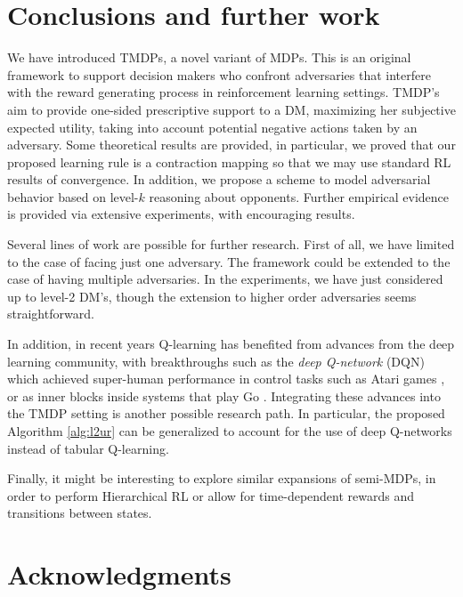 \documentclass[letterpaper]{article} %
\begin{document}
\section{Conclusions and further work}


We have introduced TMDPs, a novel variant of MDPs. This is an original framework to support decision makers who confront adversaries that interfere with the reward generating process in reinforcement learning settings. TMDP's aim to provide one-sided prescriptive support to a DM, maximizing her subjective expected utility, taking into account potential negative actions taken by an adversary. Some theoretical results are provided, in particular, we proved that our proposed learning rule is a contraction mapping so that we may use standard RL results of convergence. In addition, we propose a scheme to model adversarial behavior based on level-$k$ reasoning about opponents. Further empirical evidence is provided via extensive experiments, with encouraging results.

Several lines of work are possible for further research. First of all, we
have limited to the case of facing just one adversary. The framework could be 
extended to the case of having multiple adversaries. In the experiments, we have just considered up to level-2 DM's, though the extension to higher order adversaries seems straightforward.

In addition, in recent years Q-learning has benefited from advances from the deep learning community, with breakthroughs such as the \emph{deep Q-network} (DQN) which achieved super-human performance in control tasks such as Atari games \cite{mnih2015human}, or as inner blocks inside systems that play Go \cite{silver2017mastering}. Integrating these advances into the TMDP setting is another possible research path. In particular, the proposed Algorithm \ref{alg:l2ur} can be 
generalized to account for the use of deep Q-networks instead of tabular Q-learning.

Finally, it might be interesting to explore similar expansions of semi-MDPs, in order to perform Hierarchical RL or allow for time-dependent rewards and transitions between states.






 \section{ Acknowledgments}
 
\end{document}
